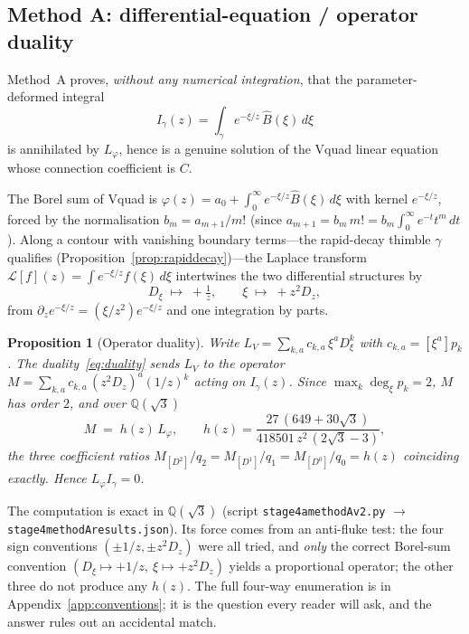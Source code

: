 \documentclass[11pt,reqno]{amsart}
\renewcommand{\_}{\vquadorigunderscore\allowbreak}
\theoremstyle{plain}
\newtheorem{proposition}[theorem]{Proposition}
\theoremstyle{definition}
\newcommand{\Bhat}{\widehat{B}}
\newcommand{\Lphi}{L_{\varphi}}
\newcommand{\LV}{L_{V}}
\newcommand{\Qsqrt}{\mathbb{Q}(\sqrt3)}
\providecommand{\C}{}\renewcommand{\C}{C}
\begin{document}
\subsection{Method A: differential-equation / operator duality}\label{sub:methodA}
Method~A proves, \emph{without any numerical integration}, that the parameter-deformed integral
\begin{equation}\label{eq:Igamma}
  I_\gamma(z)=\int_\gamma e^{-\xi/z}\,\Bhat(\xi)\,d\xi
\end{equation}
is annihilated by $\Lphi$, hence is a genuine solution of the V\_quad linear equation whose
connection coefficient is $\C$.

The Borel sum of V\_quad is $\varphi(z)=a_0+\int_0^\infty e^{-\xi/z}\Bhat(\xi)\,d\xi$ with kernel
$e^{-\xi/z}$, forced by the normalisation $b_m=a_{m+1}/m!$ (since
$a_{m+1}=b_m\,m!=b_m\int_0^\infty e^{-t}t^m\,dt$). Along a contour with vanishing boundary
terms---the rapid-decay thimble $\gamma$ qualifies (Proposition~\ref{prop:rapiddecay})---the
Laplace transform $\mathcal{L}[f](z)=\int e^{-\xi/z}f(\xi)\,d\xi$ intertwines the two differential
structures by
\begin{equation}\label{eq:duality}
  D_\xi\;\longmapsto\;+\tfrac1z,\qquad \xi\;\longmapsto\;+z^2 D_z,
\end{equation}
from $\partial_z e^{-\xi/z}=(\xi/z^2)e^{-\xi/z}$ and one integration by parts.

\begin{proposition}[Operator duality]\label{prop:methodA}
Write $\LV=\sum_{k,a}c_{k,a}\,\xi^a D_\xi^k$ with $c_{k,a}=[\xi^a]p_k$. The
duality~\eqref{eq:duality} sends $\LV$ to the operator
$M=\sum_{k,a}c_{k,a}\,(z^2D_z)^a(1/z)^k$ acting on $I_\gamma(z)$. Since $\max_k\deg_\xi p_k=2$,
$M$ has order $2$, and over $\Qsqrt$
\begin{equation}\label{eq:M-equals-hLphi}
  M\;=\;h(z)\,\Lphi,\qquad h(z)=\frac{27\,(649+30\sqrt3)}{418501\,z^2\,(2\sqrt3-3)} ,
\end{equation}
the three coefficient ratios $M_{[D^2]}/q_2=M_{[D^1]}/q_1=M_{[D^0]}/q_0=h(z)$ coinciding exactly.
Hence $\Lphi I_\gamma=0$.
\end{proposition}

The computation is exact in $\Qsqrt$ (script \texttt{stage4a\_methodA\_v2.py}
$\to$ \texttt{stage4\_methodA\_results.json}). Its force comes from an anti-fluke test: the four
sign conventions $(\pm1/z,\pm z^2D_z)$ were all tried, and \emph{only} the correct Borel-sum
convention $(D_\xi\mapsto+1/z,\ \xi\mapsto+z^2D_z)$ yields a proportional operator; the other three
do not produce any $h(z)$. The full four-way enumeration is in Appendix~\ref{app:conventions};
it is the question every reader will ask, and the answer rules out an accidental match.
\end{document}
